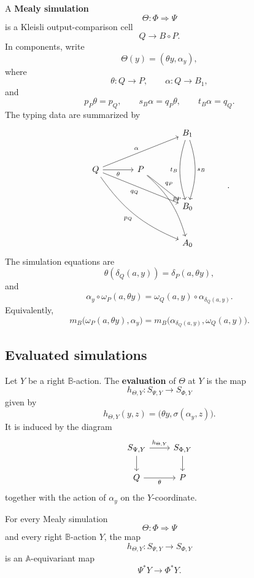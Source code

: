 \begin{definition}
\label{def:relative-mealy-simulation-component}
A \textbf{Mealy simulation}
\[
\Theta:\Phi\Rightarrow\Psi
\]
is a Kleisli output-comparison cell
\[
Q\to B\circ P.
\]
In components, write
\[
\Theta(y)=(\theta y,\alpha_y),
\]
where
\[
\theta:Q\to P,
\qquad
\alpha:Q\to B_1,
\]
and
\[
p_P\theta=p_Q,
\qquad
s_B\alpha=q_P\theta,
\qquad
t_B\alpha=q_Q.
\]
The typing data are summarized by
\[
\begin{tikzcd}[column sep=large,row sep=large]
&& B_1
  \arrow[dd,bend left=18,"s_B"]
  \arrow[dd,bend right=18,"t_B"']
&
\\
Q
  \arrow[rru,"\alpha"]
  \arrow[r,"\theta"']
  \arrow[drr,"q_Q"']
  \arrow[ddrr,bend right=16,"p_Q"']
&
P
  \arrow[dr,"q_P"]
  \arrow[rdd,bend left=16,"p_P"]
&&
\\
&& B_0 &
\\
&& A_0 &
\end{tikzcd}
.
\]
The simulation equations are
\[
\theta(\delta_Q(a,y))
=
\delta_P(a,\theta y),
\]
and
\[
\alpha_y\circ \omega_P(a,\theta y)
=
\omega_Q(a,y)\circ \alpha_{\delta_Q(a,y)}.
\]
Equivalently,
\[
m_B\bigl(\omega_P(a,\theta y),\alpha_y\bigr)
=
m_B\bigl(\alpha_{\delta_Q(a,y)},\omega_Q(a,y)\bigr).
\]
\end{definition}

\subsection{Evaluated simulations}
\label{subsec:relative-evaluated-simulations}

\begin{definition}
\label{def:relative-evaluated-simulation-map}
Let \(Y\) be a right \(\mathbb B\)-action. The \textbf{evaluation} of
\(\Theta\) at \(Y\) is the map
\[
h_{\Theta,Y}:S_{\Psi,Y}\to S_{\Phi,Y}
\]
given by
\[
h_{\Theta,Y}(y,z)
=
\bigl(\theta y,\sigma(\alpha_y,z)\bigr).
\]
It is induced by the diagram
\[
\begin{tikzcd}
S_{\Psi,Y}
\arrow[r,"h_{\Theta,Y}"]
\arrow[d]
&
S_{\Phi,Y}
\arrow[d]
\\
Q
\arrow[r,"\theta"']
&
P
\end{tikzcd}
\]
together with the action of \(\alpha_y\) on the \(Y\)-coordinate.
\end{definition}

\begin{theorem}
\label{thm:relative-simulations-evaluate-equivariantly}
For every Mealy simulation
\[
\Theta:\Phi\Rightarrow\Psi
\]
and every right \(\mathbb B\)-action \(Y\), the map
\[
h_{\Theta,Y}:S_{\Psi,Y}\to S_{\Phi,Y}
\]
is an \(\mathbb A\)-equivariant map
\[
\Psi^\ast Y\to \Phi^\ast Y.
\]
\end{theorem}

